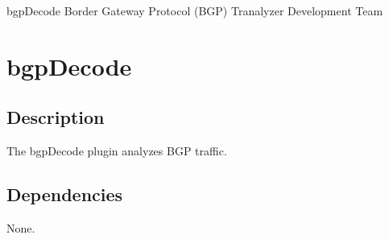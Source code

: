 \documentclass[documentation]{subfiles}
\begin{document}
\trantitle
    {bgpDecode}
    {Border Gateway Protocol (BGP)}
    {Tranalyzer Development Team} %

\section{bgpDecode}\label{s:bgpDecode}

\subsection{Description}
The bgpDecode plugin analyzes BGP traffic.

\subsection{Dependencies}
None.
\end{document}
